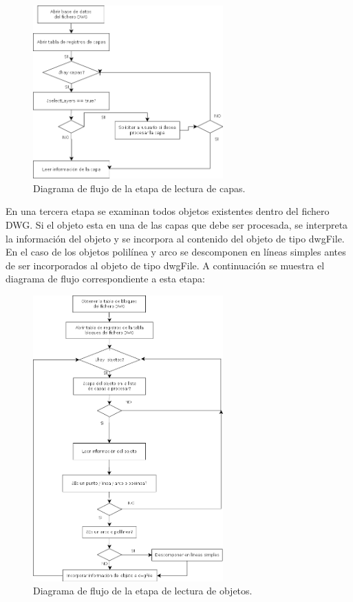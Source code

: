 \begin{itemize}
{\begin{figure}[H]
\begin{center}
\includegraphics[width=0.65\textwidth]{imgs/diagramaFlujo2}
\caption{Diagrama de flujo de la etapa de lectura de capas.}
\end{center}
\end{figure}

En una tercera etapa se examinan todos objetos existentes dentro del fichero DWG. Si el objeto esta en una de las capas que debe ser procesada, se interpreta la información del objeto y se incorpora al contenido del objeto de tipo dwgFile. En el caso de los objetos polilínea y arco se descomponen en líneas simples antes de ser incorporados al objeto de tipo dwgFile. A continuación se muestra el diagrama de flujo correspondiente a esta etapa:

\begin{figure}[H]
\begin{center}
\includegraphics[width=0.65\textwidth]{imgs/diagramaFlujo3}
\caption{Diagrama de flujo de la etapa de lectura de objetos.}
\end{center}
\end{figure}

}
\end{itemize}
